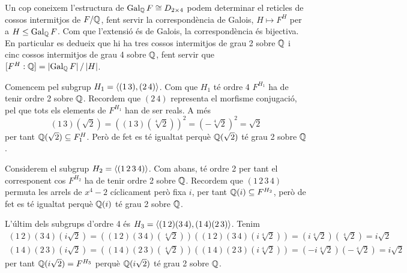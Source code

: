 \documentclass[12pt]{article}
\begin{document}
Un cop coneixem l'estructura de \( \operatorname{Gal_{\mathbb{Q}}}{F} \cong D_{2\times 4} \) podem determinar
el reticles de cossos intermitjos de \( F/\mathbb{Q} \), fent servir la correspondència de Galois,
\( H \mapsto F^H \) per a \( H \leq \operatorname{Gal_{\mathbb{Q}}}{F} \).  Com que l'extensió és de Galois, la
correspondència és bijectiva. En particular es dedueix que hi ha tres cossos intermitjos
de grau 2 sobre \( \mathbb{Q} \) i cinc cossos intermitjos de grau 4 sobre \( \mathbb{Q} \), fent servir
que \( [F^H : \mathbb{Q}] = \left\lvert \operatorname{Gal_{\mathbb{Q}}}{F} \right\rvert/\left\lvert H \right\rvert \).


Comencem pel subgrup \( H_1 = \left\langle (1\,3),(2\,4) \right\rangle \). Com que \( H_1 \) té ordre 4 \(
F^{H_1} \) ha de tenir ordre 2 sobre \( \mathbb{Q} \). Recordem que \( (2\,4) \) representa
el morfisme conjugació, pel que tots els elements de \( F^{H_1} \) han de ser reals. A
més
\begin{equation*}
	(1\,3)(\sqrt{2}) = \left((1\,3)(\sqrt[4]{2})\right)^2 = (-\sqrt[4]{2})^2 = \sqrt{2}
\end{equation*}
per tant \( \mathbb{Q}(\sqrt{2}) \subseteq F^H_1 \). Però de fet es té igualtat perquè \(
\mathbb{Q}(\sqrt{2}) \) té grau 2 sobre \( \mathbb{Q} \).

Considerem el subgrup \( H_2 = \left\langle (1\,2\,3\,4) \right\rangle \). Com abans, té ordre 2 per tant el
corresponent cos \( F^{H_2} \) ha de tenir ordre 2 sobre \( \mathbb{Q} \). Recordem que \(
(1\,2\,3\,4) \) permuta les arrels de \( x^4 - 2 \) cíclicament però fixa \( i \), per
tant \( \mathbb{Q}(i) \subseteq F^{H_2} \), però de fet es té igualtat perquè \( \mathbb{Q}(i) \) té grau
2 sobre \( \mathbb{Q} \). 

L'últim dels subgrups d'ordre 4 és \( H_3 = \left\langle (1\,2)(3\,4), (1\,4)(2\,3) \right\rangle \). Tenim 
\begin{gather*}
	(1\,2)(3\,4)(i \sqrt{2}) = \left((1\,2)(3\,4)(\sqrt[4]{2})\right)
	\left((1\,2)(3\,4)(i\sqrt[4]{2})\right) = (i \sqrt[4]{2})(\sqrt[4]{2}) = i \sqrt{2} \\
	(1\,4)(2\,3)(i \sqrt{2}) = \left((1\,4)(2\,3)(\sqrt[4]{2})\right)
	\left((1\,4)(2\,3)(i\sqrt[4]{2})\right) = (-i \sqrt[4]{2})(-\sqrt[4]{2}) = i \sqrt{2}
\end{gather*}
per tant \( \mathbb{Q}(i\sqrt{2}) = F^{H_3} \) perquè \( \mathbb{Q}(i\sqrt{2}) \) té grau 2 sobre \( \mathbb{Q}
\).
\end{document}
